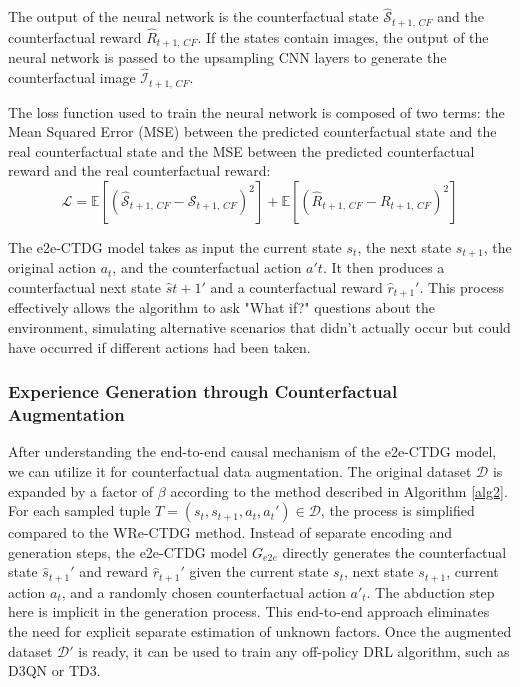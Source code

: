 The output of the neural network is the counterfactual state
$\hat{\mathcal{S}}_{t+1,\, CF}$ and the counterfactual reward
$\hat{R}_{t+1,\, CF}$.
If the states contain images, the output of the neural network
is passed to the upsampling CNN layers to generate the counterfactual
image $\hat{\mathcal{I}}_{t+1,\, CF}$.

The loss function used to train the neural network is composed of
two terms: the Mean Squared Error (MSE) between the predicted
counterfactual state and the real counterfactual state and the
MSE between the predicted counterfactual reward and the real
counterfactual reward:
\begin{equation}
    \mathcal{L} = \mathbb{E} \left[ \left( \hat{\mathcal{S}}_{t+1,\, CF} - \mathcal{S}_{t+1,\, CF} \right)^2 \right] +
    \mathbb{E} \left[ \left( \hat{R}_{t+1,\, CF} - R_{t+1,\, CF} \right)^2 \right]
\end{equation}

The e2e-CTDG model takes as input the current state $s_t$,
the next state $s_{t+1}$, the original action $a_t$,
and the counterfactual action $a't$. It then produces a counterfactual
next state $\hat{s}{t+1}'$ and a counterfactual reward $\hat{r}_{t+1}'$.
This process effectively allows the algorithm to ask "What if?"
questions about the environment, simulating alternative scenarios
that didn't actually occur but could have occurred if different actions
had been taken. 

\subsubsection{Experience Generation through Counterfactual Augmentation}

After understanding the end-to-end causal mechanism of the e2e-CTDG model,
we can utilize it for counterfactual data augmentation.
The original dataset $\mathcal{D}$ is expanded by a factor of $\beta$
according to the method described in Algorithm \ref{alg2}.
For each sampled tuple
$T = (s_t, s_{t+1}, a_t, a_{t}') \in \mathcal{D}$,
the process is simplified compared to the WRe-CTDG method.
Instead of separate encoding and generation steps,
the e2e-CTDG model $G_{e2e}$ directly generates the counterfactual
state $\hat{s}_{t+1}'$ and reward $\hat{r}_{t+1}'$
given the current state $s_t$, next state $s_{t+1}$,
current action $a_t$, and a randomly chosen counterfactual action $a'_t$.
The abduction step here is implicit in the generation process.
This end-to-end approach eliminates the need for explicit
separate estimation of unknown factors.
Once the augmented dataset $\mathcal{D}'$ is ready, it can be used to
train any off-policy DRL algorithm, such as D3QN or TD3.

